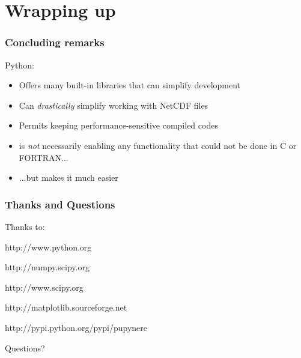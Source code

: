 \documentclass[red, hyperref={pdfpagelabels=false}]{beamer}
\begin{document}
\section{Wrapping up}
\begin{frame}[<+->]
  \frametitle{Concluding remarks}
  Python:
  \begin{itemize}
    \item Offers many built-in libraries that can simplify development
    \item Can \emph{drastically} simplify working with NetCDF files
    \item Permits keeping performance-sensitive compiled codes
    \item is \emph{not} necessarily enabling any functionality that could not be done in C or FORTRAN...
    \item ...but makes it much easier
  \end{itemize}
\end{frame}

\begin{frame}
  \frametitle{Thanks and Questions}
  Thanks to:
  \begin{description}[Matplotlib]
    \item[Python]{http://www.python.org}
    \item[NumPy]{http://numpy.scipy.org}
    \item[SciPy]{http://www.scipy.org}
    \item[Matplotlib]{http://matplotlib.sourceforge.net}
    \item[pupynere]{http://pypi.python.org/pypi/pupynere}
  \end{description}
  Questions?
\end{frame}
\end{document}
